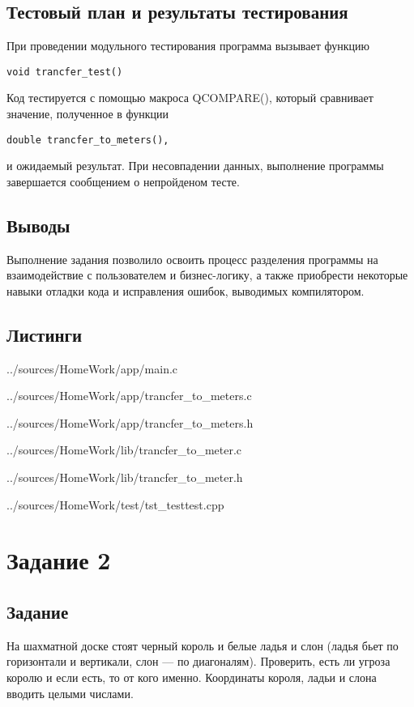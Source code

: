 \documentclass[12pt,a4paper]{report}
\begin{document}
\subsection{Тестовый план и результаты тестирования}

При проведении модульного тестирования программа вызывает функцию \begin{verbatim}void trancfer_test()\end{verbatim} Код тестируется с помощью макроса QCOMPARE(), который сравнивает значение, полученное в функции \begin{verbatim}double trancfer_to_meters(), \end{verbatim} и ожидаемый результат. При несовпадении данных, выполнение программы завершается сообщением о непройденом тесте.


\subsection{Выводы}

Выполнение задания позволило освоить процесс разделения программы на взаимодействие с пользователем и бизнес-логику, а также приобрести некоторые навыки отладки кода и исправления ошибок, выводимых компилятором.


\subsection*{Листинги}

{../sources/HomeWork/app/main.c}


{../sources/HomeWork/app/trancfer_to_meters.c}


{../sources/HomeWork/app/trancfer_to_meters.h}


{../sources/HomeWork/lib/trancfer_to_meter.c}


{../sources/HomeWork/lib/trancfer_to_meter.h}


{../sources/HomeWork/test/tst_testtest.cpp}



\section{Задание 2}
\subsection{Задание}
На шахматной доске стоят черный король и белые ладья и слон (ладья бьет по горизонтали и вертикали, слон — по диагоналям). Проверить, есть ли угроза королю и если есть, то от кого именно. Координаты короля, ладьи и слона вводить целыми числами.
\end{document}
